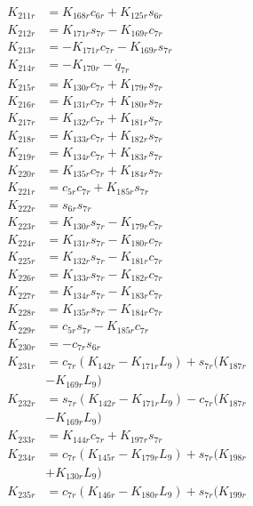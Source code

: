 \begin{multicols}{2}
\begin{align}
K_{211r} &= K_{168r}c_{6r} + K_{125r}s_{6r} \nonumber \\
K_{212r} &= K_{171r}s_{7r} - K_{169r}c_{7r} \nonumber \\
K_{213r} &= - K_{171r}c_{7r} - K_{169r}s_{7r} \nonumber \\
K_{214r} &= - K_{170r} - \dot{q}_{7r} \nonumber \\
K_{215r} &= K_{130r}c_{7r} + K_{179r}s_{7r} \nonumber \\
K_{216r} &= K_{131r}c_{7r} + K_{180r}s_{7r} \nonumber \\
K_{217r} &= K_{132r}c_{7r} + K_{181r}s_{7r} \nonumber \\
K_{218r} &= K_{133r}c_{7r} + K_{182r}s_{7r} \nonumber \\
K_{219r} &= K_{134r}c_{7r} + K_{183r}s_{7r} \nonumber \\
K_{220r} &= K_{135r}c_{7r} + K_{184r}s_{7r} \nonumber \\
K_{221r} &= c_{5r}c_{7r} + K_{185r}s_{7r} \nonumber \\
K_{222r} &= s_{6r}s_{7r} \nonumber \\
K_{223r} &= K_{130r}s_{7r} - K_{179r}c_{7r} \nonumber \\
K_{224r} &= K_{131r}s_{7r} - K_{180r}c_{7r} \nonumber \\
K_{225r} &= K_{132r}s_{7r} - K_{181r}c_{7r} \nonumber \\
K_{226r} &= K_{133r}s_{7r} - K_{182r}c_{7r} \nonumber \\
K_{227r} &= K_{134r}s_{7r} - K_{183r}c_{7r} \nonumber \\
K_{228r} &= K_{135r}s_{7r} - K_{184r}c_{7r} \nonumber \\
K_{229r} &= c_{5r}s_{7r} - K_{185r}c_{7r} \nonumber \\
K_{230r} &= -c_{7r}s_{6r} \nonumber \\
K_{231r} &= c_{7r}(K_{142r} - K_{171r}L_9) + s_{7r}(K_{187r}  \nonumber \\
&- K_{169r}L_9) \nonumber \\
K_{232r} &= s_{7r}(K_{142r} - K_{171r}L_9) - c_{7r}(K_{187r}  \nonumber \\
&- K_{169r}L_9) \nonumber \\
K_{233r} &= K_{144r}c_{7r} + K_{197r}s_{7r} \nonumber \\
K_{234r} &= c_{7r}(K_{145r} - K_{179r}L_9) + s_{7r}(K_{198r}  \nonumber \\
&+ K_{130r}L_9) \nonumber \\
K_{235r} &= c_{7r}(K_{146r} - K_{180r}L_9) + s_{7r}(K_{199r}  \nonumber \\

\end{align}
\end{multicols}
